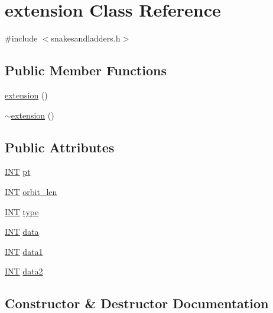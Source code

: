 \hypertarget{classextension}{}\section{extension Class Reference}
\label{classextension}


{\ttfamily \#include $<$snakesandladders.\+h$>$}

\subsection*{Public Member Functions}
\begin{DoxyCompactItemize}
\item 
\mbox{\hyperlink{classextension_a2765e1e0f221ecaaa4aa85f7b043522f}{extension}} ()
\item 
\mbox{\hyperlink{classextension_a95da97cca26fe005104623c7799cd892}{$\sim$extension}} ()
\end{DoxyCompactItemize}
\subsection*{Public Attributes}
\begin{DoxyCompactItemize}
\item 
\mbox{\hyperlink{galois_8h_a09fddde158a3a20bd2dcadb609de11dc}{I\+NT}} \mbox{\hyperlink{classextension_a20a30d16559a92a220238402941ba237}{pt}}
\item 
\mbox{\hyperlink{galois_8h_a09fddde158a3a20bd2dcadb609de11dc}{I\+NT}} \mbox{\hyperlink{classextension_a5fa9bb2d2cd4736b29e44bb88fd033be}{orbit\+\_\+len}}
\item 
\mbox{\hyperlink{galois_8h_a09fddde158a3a20bd2dcadb609de11dc}{I\+NT}} \mbox{\hyperlink{classextension_ae1e5ae14fb1b3c5743e788edcad2879a}{type}}
\item 
\mbox{\hyperlink{galois_8h_a09fddde158a3a20bd2dcadb609de11dc}{I\+NT}} \mbox{\hyperlink{classextension_a4e2eee6318ae83b188c1c5fd50aa6d86}{data}}
\item 
\mbox{\hyperlink{galois_8h_a09fddde158a3a20bd2dcadb609de11dc}{I\+NT}} \mbox{\hyperlink{classextension_a174fc1205114cab75254c6b7888e48be}{data1}}
\item 
\mbox{\hyperlink{galois_8h_a09fddde158a3a20bd2dcadb609de11dc}{I\+NT}} \mbox{\hyperlink{classextension_a0c42e7fa4e1e4f42ed1b861939dc5de6}{data2}}
\end{DoxyCompactItemize}


\subsection{Constructor \& Destructor Documentation}
\mbox{\label{classextension_a2765e1e0f221ecaaa4aa85f7b043522f}} 
